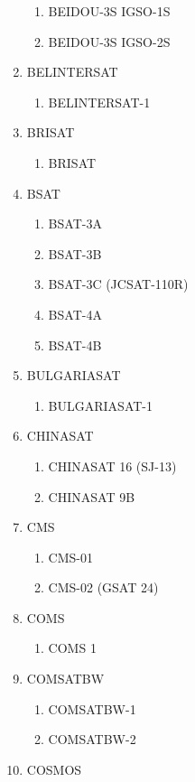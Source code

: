 \begin{multicols}{2}
\begin{enumerate}
\begin{enumerate}
    \item BEIDOU-3S IGSO-1S
    \item BEIDOU-3S IGSO-2S
  \end{enumerate}
  \item BELINTERSAT
  \begin{enumerate}
    \item BELINTERSAT-1
  \end{enumerate}
  \item BRISAT
  \begin{enumerate}
    \item BRISAT
  \end{enumerate}
  \item BSAT
  \begin{enumerate}
    \item BSAT-3A
    \item BSAT-3B
    \item BSAT-3C (JCSAT-110R)
    \item BSAT-4A
    \item BSAT-4B
  \end{enumerate}
  \item BULGARIASAT
  \begin{enumerate}
    \item BULGARIASAT-1
  \end{enumerate}
  \item CHINASAT
  \begin{enumerate}
    \item CHINASAT 16 (SJ-13)
    \item CHINASAT 9B
  \end{enumerate}
  \item CMS
  \begin{enumerate}
    \item CMS-01
    \item CMS-02 (GSAT 24)
  \end{enumerate}
  \item COMS
  \begin{enumerate}
    \item COMS 1
  \end{enumerate}
  \item COMSATBW
  \begin{enumerate}
    \item COMSATBW-1
    \item COMSATBW-2
  \end{enumerate}
  \item COSMOS
  \begin{enumerate}

\end{enumerate}
\end{enumerate}
\end{multicols}
